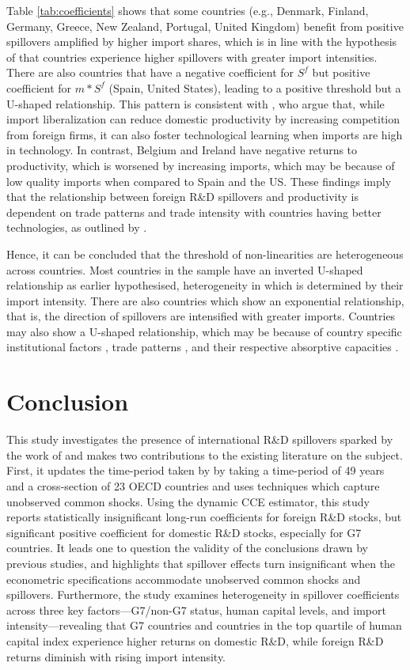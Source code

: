 \documentclass[12pt]{article}
\begin{document}
Table \ref{tab:coefficients} shows that some countries (e.g., Denmark, Finland, Germany, Greece, New Zealand, Portugal, United Kingdom) benefit from positive spillovers amplified by higher import shares, which is in line with the hypothesis of \citet{Lichtenberg1998} that countries experience higher spillovers with greater import intensities. There are also countries that have a negative coefficient for $S^f$ but positive coefficient for $m*S^f$ (Spain, United States), leading to a positive threshold but a U-shaped relationship. This pattern is consistent with \citet{Acharya2008}, who argue that, while import liberalization can reduce domestic productivity by increasing competition from foreign firms, it can also foster technological learning when imports are high in technology. In contrast, Belgium and Ireland have negative returns to productivity, which is worsened by increasing imports, which may be because of low quality imports when compared to Spain and the US. These findings imply that the relationship between foreign R\&D spillovers and productivity is dependent on trade patterns and trade intensity with countries having better technologies, as outlined by \citet{Fracasso2015}. 

Hence, it can be concluded that the threshold of non-linearities are heterogeneous across countries. Most countries in the sample have an inverted U-shaped relationship as earlier hypothesised, heterogeneity in which is determined by their import intensity. There are also countries which show an exponential relationship, that is, the direction of spillovers are intensified with greater imports. Countries may also show a U-shaped relationship, which may be because of country specific institutional factors \citep{Coe2009}, trade patterns \citep{Fracasso2015}, and their respective absorptive capacities \citep{Kneller2006}.  

\section{Conclusion}

This study investigates the presence of international R\&D spillovers sparked by the work of \citet{Coe1995} and makes two contributions to the existing literature on the subject. First, it updates the time-period taken by \citet{Coe2009} by taking a time-period of 49 years and a cross-section of 23 OECD countries and uses techniques which capture unobserved common shocks. Using the dynamic CCE estimator, this study reports statistically insignificant long-run coefficients for foreign R\&D stocks, but significant positive coefficient for domestic R\&D stocks, especially for G7 countries. It leads one to question the validity of the conclusions drawn by previous studies, and highlights that spillover effects turn insignificant when the econometric specifications accommodate unobserved common shocks and spillovers. Furthermore, the study examines heterogeneity in spillover coefficients across three key factors—G7/non-G7 status, human capital levels, and import intensity—revealing that G7 countries and countries in the top quartile of human capital index experience higher returns on domestic R\&D, while foreign R\&D returns diminish with rising import intensity.
\end{document}
